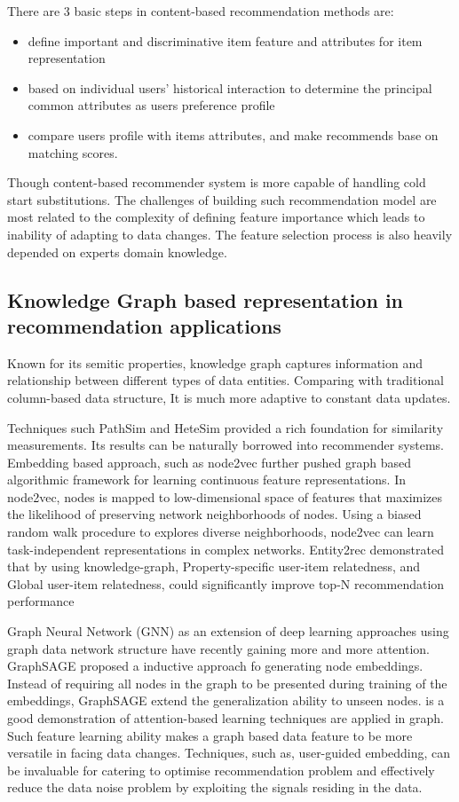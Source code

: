 There are 3 basic steps in content-based recommendation methods are: 
\begin{itemize}
    \item define important and discriminative item feature and attributes for item representation
    \item based on individual users' historical interaction to determine the principal common attributes as users preference profile
    \item compare users profile with items attributes, and make recommends base on matching scores.
\end{itemize}

Though content-based recommender system is more capable of handling cold start substitutions. The challenges of building such recommendation model are most related to the complexity of defining feature importance which leads to inability of adapting to data changes. The feature selection process is also heavily depended on experts domain knowledge. 

\subsection{Knowledge Graph based representation in recommendation applications}
Known for its semitic properties, knowledge graph captures information and relationship between different types of data entities. Comparing with traditional column-based data structure, It is much more adaptive to constant data updates. 

Techniques such PathSim \citep{Sun2011PathSim} and HeteSim \citep{Shi2013HeteSim} provided a rich foundation for similarity measurements. Its results can be naturally borrowed into recommender systems. 
Embedding based approach, such as node2vec \citep{grover2016node2vec} further pushed graph based algorithmic framework for learning continuous feature representations. In node2vec, nodes is mapped to low-dimensional space of features that maximizes the likelihood of preserving network neighborhoods of nodes. Using a biased random walk procedure to explores diverse neighborhoods, node2vec can learn task-independent representations in complex networks. 
Entity2rec \citep{palumbo2017entity2rec} demonstrated that by using knowledge-graph, Property-specific user-item relatedness, and Global user-item relatedness, could significantly improve top-N recommendation performance

Graph Neural Network (GNN) as an extension of deep learning approaches using graph data network structure have recently gaining more and more attention. 
GraphSAGE \citep{hamilton2017inductive} proposed a inductive approach fo generating node embeddings. Instead of requiring all nodes in the graph to be presented during training of the embeddings, GraphSAGE extend the generalization ability to unseen nodes. 
\citep{lee2018graph} is a good demonstration of attention-based learning techniques are applied in graph. Such feature learning ability makes a graph based data feature to be more versatile in facing data changes. 
Techniques, such as, user-guided embedding, can be invaluable for catering to optimise recommendation problem and effectively reduce the data noise problem by exploiting the signals residing in the data.

